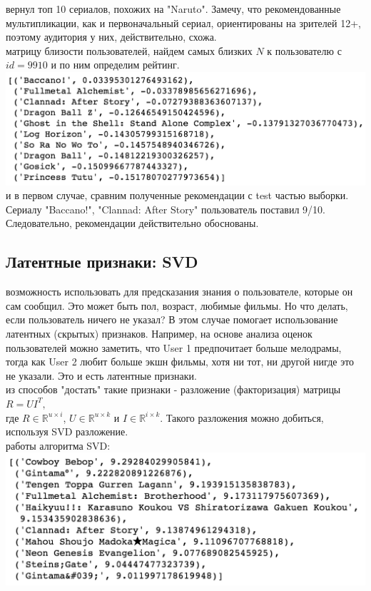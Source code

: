 \documentclass{article}
\newcommand\tab[1][1cm]{\hspace*{#1}}
\begin{document}
 вернул топ 10 сериалов, похожих на "Naruto". Замечу, что рекомендованные мультипликации, как и первоначальный сериал, ориентированы на зрителей 12+, поэтому аудитория у них, действительно, схожа.\\
 матрицу близости пользователей, найдем самых близких $N$ к пользователю с $id=9910$ и по ним определим рейтинг.
\tab\includegraphics[scale=0.8]{f17.png}\\
 и в первом случае, сравним полученные рекомендации с test частью выборки. Сериалу "Baccano!", "Clannad: After Story" пользователь поставил 9/10. Следовательно, рекомендации действительно обоснованы.\\
\subsection{Латентные признаки: SVD}
 возможность использовать для предсказания знания о пользователе, которые он сам сообщил. Это может быть пол, возраст, любимые фильмы. Но что делать, если пользователь ничего не указал? В этом случае помогает использование латентных (скрытых) признаков. Например, на основе анализа оценок пользователей можно заметить, что User 1 предпочитает больше мелодрамы, тогда как User 2 любит больше экшн фильмы, хотя ни тот, ни другой нигде это не указали. Это и есть латентные признаки.\\
 из способов "достать" такие признаки - разложение (факторизация) матрицы\\
\tab$R=UI^T,$\\
где $R\in\mathbb{R}^{u\times{}i}$, $U\in\mathbb{R}^{u\times{}k}$ и $I\in\mathbb{R}^{i\times{}k}$. Такого разложения можно добиться, используя SVD разложение.\\
 работы алгоритма SVD:\\
\tab\includegraphics[scale=0.8]{f18.png}\\
\newpage
{}
\end{document}
